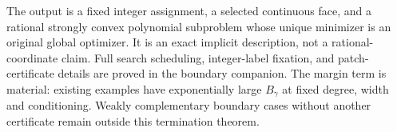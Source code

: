 The output is a fixed integer assignment, a selected continuous face,
and a rational strongly convex polynomial subproblem whose unique
minimizer is an original global optimizer. It is an exact implicit
description, not a rational-coordinate claim. Full search scheduling,
integer-label fixation, and patch-certificate details are proved in the
boundary companion. The margin term is material: existing examples have
exponentially large $B_\gamma$ at fixed degree, width and conditioning.
Weakly complementary boundary cases without another certificate remain
outside this termination theorem.

